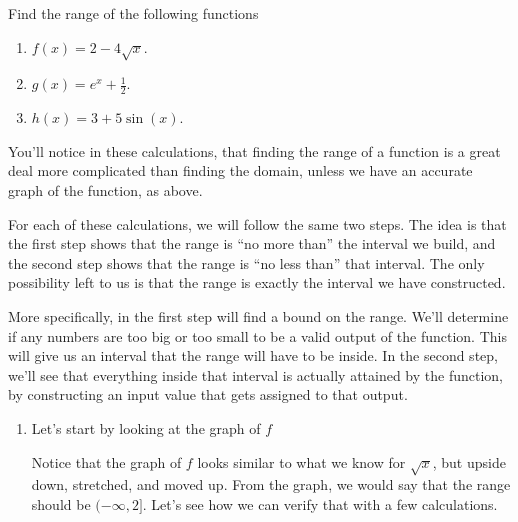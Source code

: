 \documentclass[nooutcomes]{ximera}
\begin{document}
	\begin{example}
		Find the range of the following functions 
		\begin{enumerate}
			\item $\displaystyle f(x) = 2 - 4 \sqrt{x}$.
			\item $\displaystyle g(x) = e^x + \frac{1}{2}$.
			\item $\displaystyle h(x) = 3 + 5\sin(x)$.
		\end{enumerate}

		\begin{explanation}

			You'll notice in these calculations, that finding the range of a function is a great deal more complicated than finding the domain, unless we have an accurate graph of the
			function, as above.
						
			For each of these calculations, we will follow the same two steps. 
			The idea is that the first step shows that the range is ``no more than'' the interval we build, and the second step shows that the range is ``no less than'' that interval. The
			only possibility left to us is that the range is exactly the interval we have constructed.

			More specifically, in the first step will find a bound on the range. We'll determine if any numbers are too big or too small to be a valid output of the function. 
			This will give us an interval that the range will have to be inside.
			In the second step, we'll see that everything inside that interval is actually attained by the function, by constructing an input value that gets assigned to that output.
			
			
			\begin{enumerate}
				\item Let's start by looking at the graph of $f$
					\begin{image}
					\end{image}
					Notice that the graph of $f$ looks similar to what we know for $\sqrt{x}$, but upside down, stretched, and moved up. From the 
					graph, we would say that the range should be $(-\infty, 2]$. Let's see how we can verify that with a few calculations.
					

\end{enumerate}
\end{explanation}
\end{example}
\end{document}
